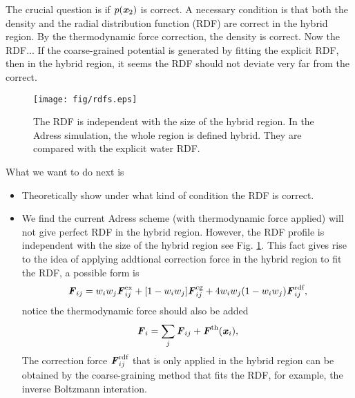 \documentclass[aps,pre,preprint]{revtex4}
\newcommand{\redc}[1]{{\color{red} #1}}
\newcommand{\bluec}[1]{{\color{blue} #1}}
\renewcommand{\v}[1]{\textbf{\textit{#1}}}
\begin{document}
The crucial question is if $p(\v x_2)$ is correct.  A necessary
condition is that both the density and the radial distribution
function (RDF) are correct in the hybrid region. By the thermodynamic
force correction, the density is correct. Now the RDF...  If the
coarse-grained potential is generated by fitting the explicit RDF,
\redc{then in the hybrid region, it seems the RDF should not deviate very
  far from the correct.}

\begin{figure}
  \centering
  \texttt{[image: fig/rdfs.eps]}
  \caption{The RDF is independent with the size of the hybrid region.
    In the Adress simulation, the whole region is defined hybrid. They
    are compared with the explicit water RDF.}
  \label{fig:tmp2}
\end{figure}

\bluec{
  What we want to do next is
  \begin{itemize}
  \item Theoretically show under what kind of condition the RDF is
    correct.
  \item We find the current Adress scheme (with thermodynamic force
    applied) will not give perfect RDF in the hybrid region. However,
    the RDF profile is independent with the size of the hybrid region
    see Fig. \ref{fig:tmp2}. This fact gives rise to the idea of
    applying addtional correction force in the hybrid region to fit
    the RDF, a possible form is
    \begin{align}
      \v F_{ij} = w_iw_j\v F^{\textrm{ex}}_{ij} + [1-w_iw_j]\v F^{\textrm{cg}}_{ij} +
      4 w_iw_j (1 - w_iw_j)\v F_{ij}^{\textrm{rdf}},
    \end{align}
    notice the thermodynamic force should also be added
    \begin{align}
      \v F_i = \sum_j\v F_{ij} + \v F^{\textrm{th}}(\v x_i),
    \end{align}
    The correction force $\v F_{ij}^{\textrm{rdf}}$ that is only
    applied in the hybrid region can be obtained by the
    coarse-graining method that fits the RDF, for example, the inverse
    Boltzmann interation. 
  \end{itemize}
}
  
\end{document}
